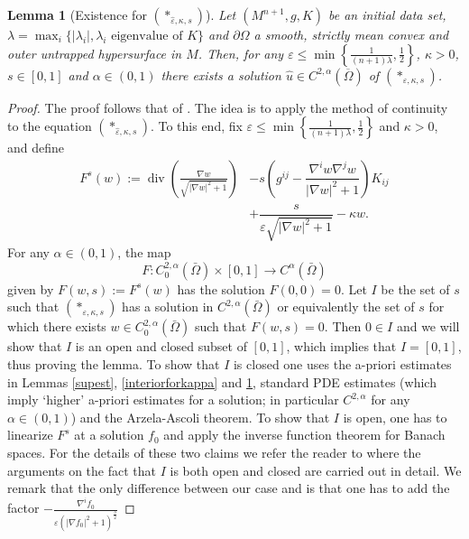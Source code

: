 \documentclass[11pt]{amsart}
\newtheorem{Lemma}[Theorem]{Lemma}
\renewcommand{\epsilon}{\varepsilon}
\DeclareMathOperator{\dvg}{div} \DeclareMathOperator{\spt}{spt}
\def\a{\alpha}
\def\e{\epsilon}
\def\l{\lambda}
\def\k{\kappa}
\def\ov{\overline}
\begin{document}
\begin{Lemma}[Existence for $(*_{\hat{\varepsilon},\kappa,s})$]\label{kappaexists}
Let $(M^{n+1},g,K)$ be an initial data set, $\lambda=\max_i\{|\l_i|, \l_i\text{  eigenvalue of  } K\}$ and $\partial\Omega$  a smooth, strictly mean convex and  outer untrapped hypersurface in $M$. Then, for any $\e\le \min\left\{\frac{1}{(n+1)\lambda},\frac12\right\}$, $\k>0$, $s\in[0,1]$ and $\a\in(0,1)$ there exists a  solution $\hat{u}\in C^{2,\a}(\ov{\Omega})$ of $(*_{\hat{\varepsilon},\kappa,s})$.
\end{Lemma}
\begin{proof} The proof follows that of \cite[Lemma 3]{SY81}.
The idea is to apply the method of continuity to the equation $(*_{\hat{\varepsilon},\kappa,s})$. To this end, fix $\varepsilon\le \min\left\{\frac{1}{(n+1)\lambda},\frac12\right\}$ and $\k>0$,  and define
\begin{align*}
F^s(w):=\dvg\left(\frac{\nabla w}{\sqrt{|\nabla w|^2+1}}\right)&-s\left(g^{ij}-\dfrac{\nabla^iw\nabla^jw}{|\nabla w|^2+1}\right)K_{ij}\\
&+\dfrac{s}{\varepsilon \sqrt{|\nabla w|^2+1}}-\kappa w.
\end{align*}
For any $\a\in (0,1)$,  the map 
\begin{equation*}
F: C^{2,\alpha}_0(\bar{\Omega})\times[0,1]\to C^{\alpha}(\bar{\Omega}) 
\end{equation*}
given by $F(w,s):=F^s(w)$  has the solution $F(0,0)=0$. Let $I$ be the set of $s$ such that $(*_{\varepsilon,\kappa,s})$ has a solution in $C^{2,\alpha}(\bar{\Omega})$ or equivalently the set of $s$ for which there exists $w\in C^{2,\alpha}_0(\bar{\Omega})$ such that $F(w,s)=0$. Then $0\in I$ and we will show that $I$ is an open and closed subset of $[0,1]$, which implies that $I=[0,1]$, thus proving the lemma. To show that $I$ is closed one uses  the a-priori estimates in Lemmas \ref{supest}, \ref{interiorforkappa} and \ref{kappaexists}, standard PDE estimates (which imply `higher' a-priori estimates for a solution; in particular $C^{2,\a}$ for any $\a\in (0,1)$) and the Arzela-Ascoli theorem. To show that $I$ is open, one has to linearize $F^s$ at a solution $f_0$ and apply the inverse function theorem for Banach spaces. For the details of these two claims we refer the reader to \cite[Lemmas 2 and 3]{SY81}   where the arguments on the fact that $I$ is both open and closed are carried out in detail. We remark that the only difference between our case and \cite[Lemma 3]{SY81} is that one has to add the factor $-\frac{\nabla^i f_0}{\e(|\nabla f_0|^2+1)^\frac32}$

\end{proof}
\end{document}
